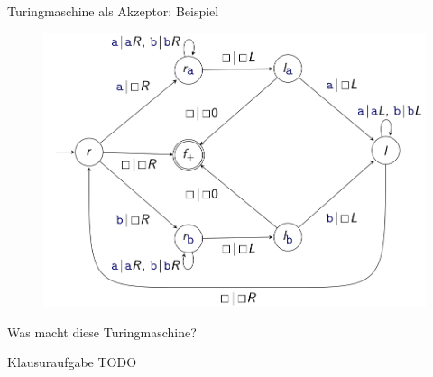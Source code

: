 \begin{frame}{Turingmaschine als Akzeptor: Beispiel}
    \begin{figure}
        \includegraphics[scale=0.3]{graphics/12/palindrom.png}
    \end{figure}
    Was macht diese Turingmaschine?
\end{frame}
\begin{frame}{Klausuraufgabe}
    TODO
\end{frame}
